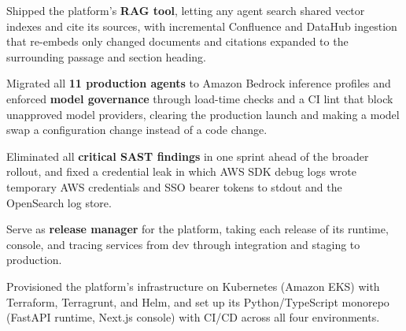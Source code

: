 \documentclass[letterpaper,9pt]{extarticle}
\begin{document}
{                \item Shipped the platform's \textbf{RAG tool}, letting any agent search shared vector indexes and cite its sources, with incremental Confluence and DataHub ingestion that re-embeds only changed documents and citations expanded to the surrounding passage and section heading.

                \item Migrated all \textbf{11 production agents} to Amazon Bedrock inference profiles and enforced \textbf{model governance} through load-time checks and a CI lint that block unapproved model providers, clearing the production launch and making a model swap a configuration change instead of a code change.

                \item Eliminated all \textbf{critical SAST findings} in one sprint ahead of the broader rollout, and fixed a credential leak in which AWS SDK debug logs wrote temporary AWS credentials and SSO bearer tokens to stdout and the OpenSearch log store.

                \item Serve as \textbf{release manager} for the platform, taking each release of its runtime, console, and tracing services from dev through integration and staging to production.

                \item Provisioned the platform's infrastructure on Kubernetes (Amazon EKS) with Terraform, Terragrunt, and Helm, and set up its Python/TypeScript monorepo (FastAPI runtime, Next.js console) with CI/CD across all four environments.
            }
            \vspace{2pt}
\end{document}
